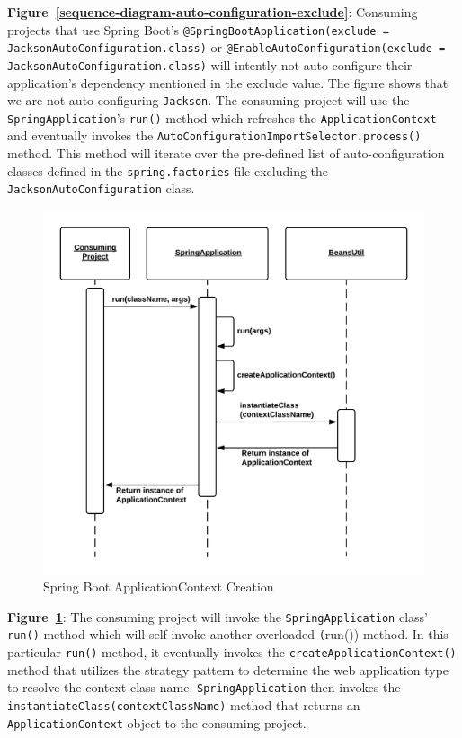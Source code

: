 \textbf{Figure~\ref{sequence-diagram-auto-configuration-exclude}}: Consuming projects that use Spring Boot's \texttt{@SpringBootApplication(exclude = JacksonAutoConfiguration.class)} or \texttt{@EnableAutoConfiguration(exclude = JacksonAutoConfiguration.class)} will intently not auto-configure their application's dependency mentioned in the exclude value. The figure shows that we are not auto-configuring \texttt{Jackson}. The consuming project will use the \texttt{SpringApplication}'s \texttt{run()} method which refreshes the \texttt{ApplicationContext} and eventually invokes the \texttt{AutoConfigurationImportSelector.process()} method. This method will iterate over the pre-defined list of auto-configuration classes defined in the \texttt{spring.factories} file excluding the \texttt{JacksonAutoConfiguration} class.

\begin{figure}[H]
    \centering
    \includegraphics[width=.7\textwidth, height=\textheight, keepaspectratio]{content/architectural-views-top-level/application-context.png}
    \caption{Spring Boot ApplicationContext Creation}
    \label{sequence-diagram-application-context}
\end{figure}

\textbf{Figure~\ref{sequence-diagram-application-context}}: The consuming project will invoke the \texttt{SpringApplication} class' \texttt{run()} method which will self-invoke another overloaded \texttt(run()) method. In this particular \texttt{run()} method, it eventually invokes the \texttt{createApplicationContext()} method that utilizes the strategy pattern to determine the web application type to resolve the context class name. \texttt{SpringApplication} then invokes the \texttt{instantiateClass(contextClassName)} method that returns an \texttt{ApplicationContext} object to the consuming project.

